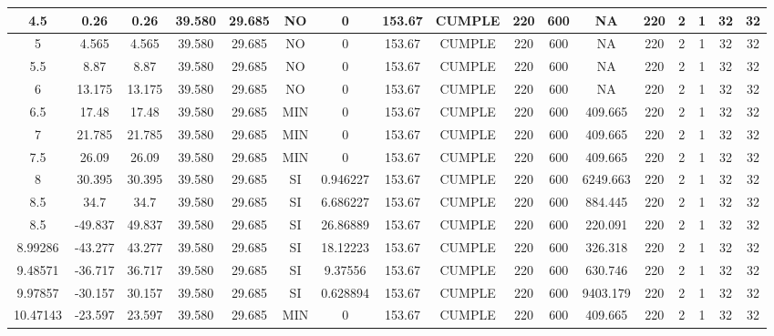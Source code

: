 \begin{table}[H]
{\begin{tabular}{|c|c|c|c|c|c|c|c|c|c|c|c|c|c|c|c|c|}
    \hline
    4.5 & 0.26 & 0.26 & 39.580 & 29.685 & NO  & 0   & 153.67 & CUMPLE & 220 & 600 & NA  & 220 & 2   & 1   & 32  & 32 \bigstrut\\
    \hline
    5   & 4.565 & 4.565 & 39.580 & 29.685 & NO  & 0   & 153.67 & CUMPLE & 220 & 600 & NA  & 220 & 2   & 1   & 32  & 32 \bigstrut\\
    \hline
    5.5 & 8.87 & 8.87 & 39.580 & 29.685 & NO  & 0   & 153.67 & CUMPLE & 220 & 600 & NA  & 220 & 2   & 1   & 32  & 32 \bigstrut\\
    \hline
    6   & 13.175 & 13.175 & 39.580 & 29.685 & NO  & 0   & 153.67 & CUMPLE & 220 & 600 & NA  & 220 & 2   & 1   & 32  & 32 \bigstrut\\
    \hline
    6.5 & 17.48 & 17.48 & 39.580 & 29.685 & MIN & 0   & 153.67 & CUMPLE & 220 & 600 & 409.665 & 220 & 2   & 1   & 32  & 32 \bigstrut\\
    \hline
    7   & 21.785 & 21.785 & 39.580 & 29.685 & MIN & 0   & 153.67 & CUMPLE & 220 & 600 & 409.665 & 220 & 2   & 1   & 32  & 32 \bigstrut\\
    \hline
    7.5 & 26.09 & 26.09 & 39.580 & 29.685 & MIN & 0   & 153.67 & CUMPLE & 220 & 600 & 409.665 & 220 & 2   & 1   & 32  & 32 \bigstrut\\
    \hline
    8   & 30.395 & 30.395 & 39.580 & 29.685 & SI  & 0.946227 & 153.67 & CUMPLE & 220 & 600 & 6249.663 & 220 & 2   & 1   & 32  & 32 \bigstrut\\
    \hline
    8.5 & 34.7 & 34.7 & 39.580 & 29.685 & SI  & 6.686227 & 153.67 & CUMPLE & 220 & 600 & 884.445 & 220 & 2   & 1   & 32  & 32 \bigstrut\\
    \hline
    8.5 & -49.837 & 49.837 & 39.580 & 29.685 & SI  & 26.86889 & 153.67 & CUMPLE & 220 & 600 & 220.091 & 220 & 2   & 1   & 32  & 32 \bigstrut\\
    \hline
    8.99286 & -43.277 & 43.277 & 39.580 & 29.685 & SI  & 18.12223 & 153.67 & CUMPLE & 220 & 600 & 326.318 & 220 & 2   & 1   & 32  & 32 \bigstrut\\
    \hline
    9.48571 & -36.717 & 36.717 & 39.580 & 29.685 & SI  & 9.37556 & 153.67 & CUMPLE & 220 & 600 & 630.746 & 220 & 2   & 1   & 32  & 32 \bigstrut\\
    \hline
    9.97857 & -30.157 & 30.157 & 39.580 & 29.685 & SI  & 0.628894 & 153.67 & CUMPLE & 220 & 600 & 9403.179 & 220 & 2   & 1   & 32  & 32 \bigstrut\\
    \hline
    10.47143 & -23.597 & 23.597 & 39.580 & 29.685 & MIN & 0   & 153.67 & CUMPLE & 220 & 600 & 409.665 & 220 & 2   & 1   & 32  & 32 \bigstrut\\

\end{tabular}}
\end{table}
